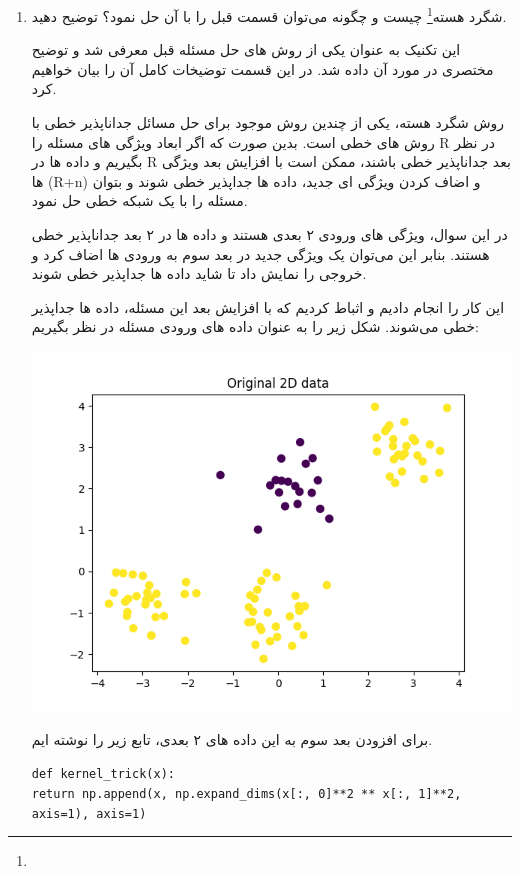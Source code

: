 \begin{enumerate}
	
	
	
	
	
	
	
	\item  شگرد هسته\footnote{} چیست و چگونه می‌توان قسمت قبل را با آن حل نمود؟ توضیح دهید.
	
	\begin{qsolve}
		این تکنیک به عنوان یکی از روش های حل مسئله قبل معرفی شد و توضیح مختصری در مورد آن داده شد. در این قسمت توضیخات کامل آن را بیان خواهیم کرد.
		
		روش شگرد هسته، یکی از چندین روش موجود برای حل مسائل جداناپذیر خطی با روش های خطی است. بدین صورت که اگر ابعاد ویژگی های مسئله را R در نظر بگیریم و داده ها در R بعد جداناپذیر خطی باشند، ممکن است با افزایش بعد ویژگی ها (R+n) و اضاف کردن ویژگی ای جدید، داده ها جداپذیر خطی شوند و بتوان مسئله را با یک شبکه خطی حل نمود.
		
		در این سوال، ویژگی های ورودی ۲ بعدی هستند و داده ها در ۲ بعد جداناپذیر خطی هستند. بنابر این می‌توان یک ویژگی جدید در بعد سوم به ورودی ها اضاف کرد و خروجی را نمایش داد تا شاید داده ها جدا‌پذیر خطی شوند.
		
		این کار را انجام دادیم و اثباط کردیم که با افزایش بعد این مسئله، داده ها جداپذیر خطی می‌شوند. شکل زیر را به عنوان داده های ورودی مسئله در نظر بگیریم:
		
		\begin{center}
			\includegraphics*[width=0.6\linewidth]{pics/img5.png}
			\label{داده های ورودی مسئله در ۲ بعد}
		\end{center}
		
		برای افزودن بعد سوم به این داده های ۲ بعدی، تابع زیر را نوشته ایم.
	\end{qsolve}
	
	
	\begin{qsolve}
		
		\begin{latin}
			\texttt{def kernel\_trick(x):}\\
			\texttt{return np.append(x, np.expand\_dims(x[:, 0]**2 ** x[:, 1]**2, axis=1), axis=1)}
		\end{latin}
		

\end{qsolve}
\end{enumerate}
